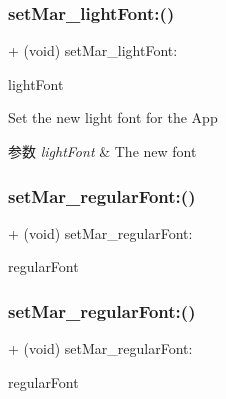\subsubsection{\texorpdfstring{set\+Mar\+\_\+light\+Font\+:()}{setMar\_lightFont:()}\hspace{0.1cm}{\footnotesize\ttfamily [2/2]}}
{\footnotesize\ttfamily + (void) set\+Mar\+\_\+light\+Font\+: \begin{DoxyParamCaption}\item[{(U\+I\+Font $\ast$\+\_\+\+Nullable)}]{light\+Font }\end{DoxyParamCaption}}

Set the new light font for the App


\begin{DoxyParams}{参数}
{\em light\+Font} & The new font \\
\hline
\end{DoxyParams}
\mbox{\label{category_u_i_font_07_m_a_r_e_x_08_a2308a1349301ab3f2b710c9ed1c2c3fa}} 
\subsubsection{\texorpdfstring{set\+Mar\+\_\+regular\+Font\+:()}{setMar\_regularFont:()}\hspace{0.1cm}{\footnotesize\ttfamily [1/2]}}
{\footnotesize\ttfamily + (void) set\+Mar\+\_\+regular\+Font\+: \begin{DoxyParamCaption}\item[{(U\+I\+Font $\ast$)}]{regular\+Font }\end{DoxyParamCaption}\hspace{0.3cm}{\ttfamily [implementation]}}

\mbox{\label{category_u_i_font_07_m_a_r_e_x_08_a85d18fa87563106d4ee05af69e4d1b66}} 
\subsubsection{\texorpdfstring{set\+Mar\+\_\+regular\+Font\+:()}{setMar\_regularFont:()}\hspace{0.1cm}{\footnotesize\ttfamily [2/2]}}
{\footnotesize\ttfamily + (void) set\+Mar\+\_\+regular\+Font\+: \begin{DoxyParamCaption}\item[{(U\+I\+Font $\ast$\+\_\+\+Nullable)}]{regular\+Font }\end{DoxyParamCaption}}

